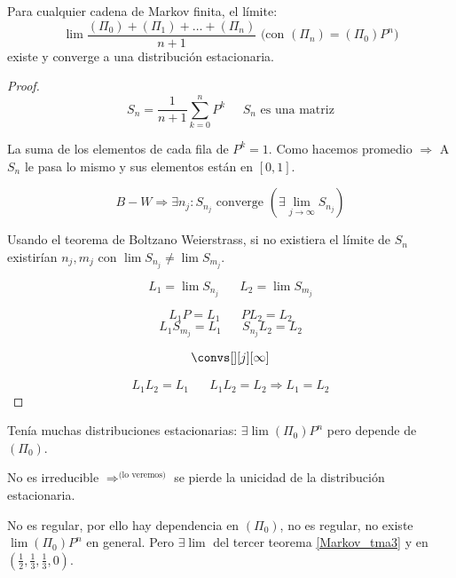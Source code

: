 \begin{theorem}[Teorema 3]
	\label{Markov_tma3}
	Para cualquier cadena de Markov finita, el límite:
	\[\lim \frac{(\Pi_0)+(\Pi_1)+…+(\Pi_n)}{n+1}  \text{ (con }(\Pi_n) = (\Pi_0)P^n\text{)}\]
	existe y converge a una distribución estacionaria.

\end{theorem}

\begin{proof}

	$$ S_n = \frac{1}{n+1} \sum\limits^{n}_{k=0} P^k \;\;\;\;\; S_n \text{ es una matriz} $$

	La suma de los elementos de cada fila de $P^k = 1$. Como hacemos promedio $\Rightarrow$ A $S_n$ le pasa lo mismo y sus elementos están en $[0,1]$.

	$$B-W \Rightarrow \exists n_j : S_{n_j} \text{ converge } (\exists \lim_{j \rightarrow \infty} S_{n_j})$$

	Usando el teorema de Boltzano Weierstrass, si no existiera el límite de $S_n$ existirían $n_j, m_j$ con $\lim S_{n_j} \neq \lim S_{m_j}$.

	$$L_1 = \lim S_{n_j} \;\;\;\;\;\; L_2 = \lim S_{m_j}$$

	$$L_1 P = L_1 \;\;\;\;\;\; P L_2 = L_2$$
	$$L_1 S_{m_j} = L_1 \;\;\;\;\;\; S_{n_j} L_2 = L_2$$

	$$ \convs[][j][\infty] $$

	$$L_1 L_2 = L_1 \;\;\;\;\;\; L_1L_2 = L_2 \Rightarrow L_1 = L_2 $$

\end{proof}

\begin{example}

\begin{center}
\end{center}

Tenía muchas distribuciones estacionarias: $\exists \lim(\Pi_0)P^n$ pero depende de $(\Pi_0)$.

No es irreducible $\Rightarrow^{\text{(lo veremos)}}$ se pierde la unicidad de la distribución estacionaria.

\end{example}

\begin{example}

\begin{center}
\end{center}

No es regular, por ello hay dependencia en $(\Pi_0)$, no es regular, no existe $\lim(\Pi_0) P^n$ en general. Pero $\exists \lim$ del tercer teorema \ref{Markov_tma3} y en $\left(\frac{1}{2},\frac{1}{3},\frac{1}{3},0\right)$.

\end{example}


